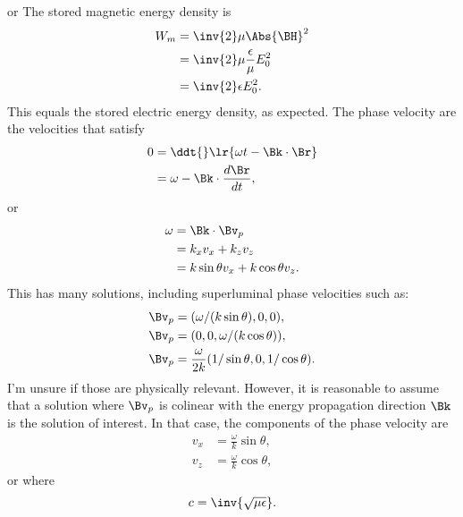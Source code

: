 {{\begin{equation}
\end{equation}
or
The stored magnetic energy density is
\begin{equation}\label{eqn:emtproblemSet6Problem3:280}
\begin{aligned}
W_m
&= \inv{2} \mu \Abs{\BH}^2
\\ &= \inv{2} \mu \frac{\epsilon}{\mu} E_0^2
\\ &= \inv{2} \epsilon E_0^2.
\end{aligned}
\end{equation}
This equals the stored electric energy density, as expected.
The phase velocity are the velocities that satisfy
\begin{equation}\label{eqn:emtproblemSet6Problem3:300}
\begin{aligned}
0
&=
\ddt{} \lr{ \omega t - \Bk \cdot \Br }
\\ &=
\omega - \Bk \cdot \frac{d\Br}{dt},
\end{aligned}
\end{equation}
or
\begin{equation}\label{eqn:emtproblemSet6Problem3:380}
\begin{aligned}
\omega &=
\Bk \cdot \Bv_p
\\ &=
k_x v_x
+
k_z v_z
\\ &=
k \sin\theta v_x
+
k \cos\theta v_z.
\end{aligned}
\end{equation}
This has many solutions, including superluminal phase velocities such as:
\begin{equation}\label{eqn:emtproblemSet6Problem3:420}
\begin{aligned}
\Bv_p &= (\omega/(k\sin\theta), 0, 0), \\
\Bv_p &= (0, 0, \omega/(k\cos\theta)), \\
\Bv_p &= \frac{\omega}{2 k}(1/\sin\theta, 0, 1/\cos\theta).
\end{aligned}
\end{equation}
I'm unsure if those are physically relevant.  However,
it is reasonable to assume that a solution where \( \Bv_p \) is colinear with the energy propagation direction \( \Bk \) is the solution of interest.  In that case, the components of the phase velocity are
\begin{equation}\label{eqn:emtproblemSet6Problem3:320}
\begin{aligned}
v_x &= \frac{\omega}{k}\sin\theta, \\
v_z &= \frac{\omega}{k}\cos\theta,
\end{aligned}
\end{equation}
or
where
\begin{equation}\label{eqn:emtproblemSet6Problem3:360}
c = \inv{\sqrt{\mu \epsilon}}.
\end{equation}
}}
